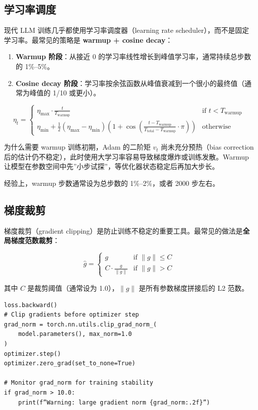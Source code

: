 \documentclass[a4paper]{article}
\begin{document}
\subsection{学习率调度}

现代 LLM 训练几乎都使用学习率调度器（learning rate scheduler），而不是固定学习率。最常见的策略是 \textbf{warmup + cosine decay}：

\begin{enumerate}
    \item \textbf{Warmup 阶段}：从接近 0 的学习率线性增长到峰值学习率，通常持续总步数的 1\%--5\%。
    \item \textbf{Cosine decay 阶段}：学习率按余弦函数从峰值衰减到一个很小的最终值（通常为峰值的 1/10 或更小）。
\end{enumerate}

$$
\eta_t = \begin{cases}
\eta_{\max} \cdot \frac{t}{T_{\text{warmup}}} & \text{if } t < T_{\text{warmup}} \\[6pt]
\eta_{\min} + \frac{1}{2}(\eta_{\max} - \eta_{\min})\left(1 + \cos\left(\frac{t - T_{\text{warmup}}}{T_{\text{total}} - T_{\text{warmup}}} \cdot \pi\right)\right) & \text{otherwise}
\end{cases}
$$

\begin{knowledgebox}{为什么需要 warmup}
训练初期，Adam 的二阶矩 $v_t$ 尚未充分预热（bias correction 后的估计仍不稳定），此时使用大学习率容易导致梯度爆炸或训练发散。Warmup 让模型在参数空间中先”小步试探”，等优化器状态稳定后再加大步长。

经验上，warmup 步数通常设为总步数的 1\%--2\%，或者 2000 步左右。
\end{knowledgebox}

\subsection{梯度裁剪}

梯度裁剪（gradient clipping）是防止训练不稳定的重要工具。最常见的做法是\textbf{全局梯度范数裁剪}：

$$
\hat{g} = \begin{cases}
g & \text{if } \|g\| \leq C \\
C \cdot \frac{g}{\|g\|} & \text{if } \|g\| > C
\end{cases}
$$

其中 $C$ 是裁剪阈值（通常设为 1.0），$\|g\|$ 是所有参数梯度拼接后的 L2 范数。

\begin{lstlisting}[caption={梯度裁剪的标准用法}]
loss.backward()
# Clip gradients before optimizer step
grad_norm = torch.nn.utils.clip_grad_norm_(
    model.parameters(), max_norm=1.0
)
optimizer.step()
optimizer.zero_grad(set_to_none=True)

# Monitor grad_norm for training stability
if grad_norm > 10.0:
    print(f”Warning: large gradient norm {grad_norm:.2f}”)
\end{lstlisting}
\end{document}
